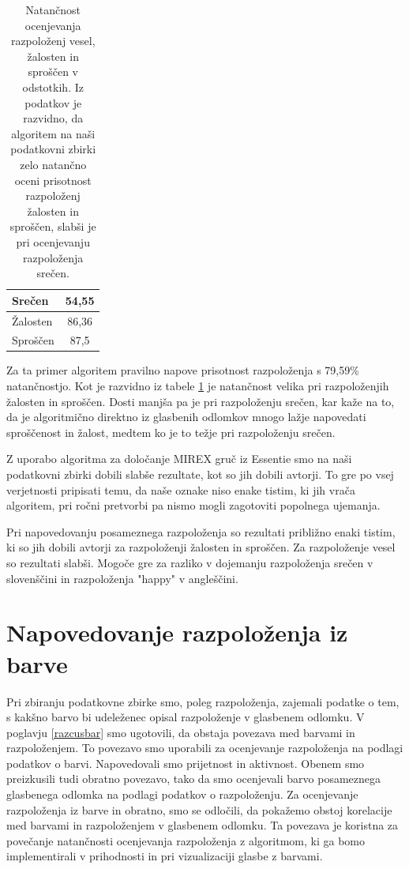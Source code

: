 \documentclass[a4paper, 12pt]{book}
\begin{document}
{\begin{table}[htb]
\begin{center}
\caption{Natančnost ocenjevanja razpoloženj vesel, žalosten in sproščen v odstotkih. Iz podatkov je razvidno, da algoritem na naši podatkovni zbirki zelo natančno oceni prisotnost razpoloženj žalosten in sproščen, slabši je pri ocenjevanju razpoloženja srečen. }
\begin{tabular}{|l|c|}
\hline
Srečen & 54,55\\ \hline
Žalosten & 86,36\\ \hline
Sproščen & 87,5\\ \hline

\end{tabular}
\label{natancnost_es_custva}
\end{center}
\end{table}

Za ta primer algoritem pravilno napove prisotnost razpoloženja s 79,59\% natančnostjo. Kot je razvidno iz tabele \ref{natancnost_es_custva} je natančnost velika pri razpoloženjih žalosten in sproščen. Dosti manjša pa je pri razpoloženju srečen, kar kaže na to, da je algoritmično direktno iz glasbenih odlomkov mnogo lažje napovedati sproščenost in žalost, medtem ko je to težje pri razpoloženju srečen. 

Z uporabo algoritma za določanje MIREX gruč iz Essentie smo na naši podatkovni zbirki dobili slabše rezultate, kot so jih dobili avtorji. To gre po vsej verjetnosti pripisati temu, da naše oznake niso enake tistim, ki jih vrača algoritem, pri ročni pretvorbi pa nismo mogli zagotoviti popolnega ujemanja. 

Pri napovedovanju posameznega razpoloženja so rezultati približno enaki tistim, ki so jih dobili avtorji za razpoloženji žalosten in sproščen. Za razpoloženje vesel so rezultati slabši. Mogoče gre za razliko v dojemanju razpoloženja srečen v slovenščini in razpoloženja "happy" v angleščini. 

\chapter{Napovedovanje razpoloženja iz barve}

Pri zbiranju podatkovne zbirke smo, poleg razpoloženja, zajemali podatke o tem, s kakšno barvo bi udeleženec opisal razpoloženje v glasbenem odlomku. V poglavju \ref{razcusbar} smo ugotovili, da obstaja povezava med barvami in razpoloženjem. To povezavo smo uporabili za ocenjevanje razpoloženja na podlagi podatkov o barvi. Napovedovali smo prijetnost in aktivnost. Obenem smo preizkusili tudi obratno povezavo, tako da smo ocenjevali barvo posameznega glasbenega odlomka na podlagi podatkov o razpoloženju. Za ocenjevanje razpoloženja iz barve in obratno, smo se odločili, da pokažemo obstoj korelacije med barvami in razpoloženjem v glasbenem odlomku. Ta povezava je koristna za povečanje natančnosti ocenjevanja razpoloženja z algoritmom, ki ga bomo implementirali v prihodnosti in pri vizualizaciji glasbe z barvami.

}
\end{document}
